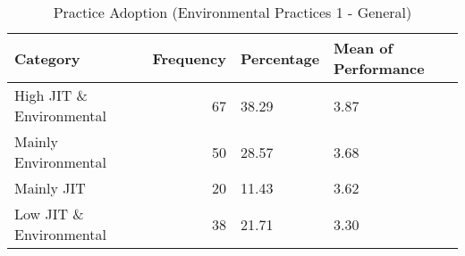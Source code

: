 \begin{table}[htbp]
    \centering
    \caption{Practice Adoption (Environmental Practices 1 - General)}
    \label{tab:your_label}
    \begin{tabular}{lrll}
\toprule
Category & Frequency & Percentage & Mean of Performance \\
\midrule
High JIT \& Environmental & 67 & 38.29 & 3.87 \\
Mainly Environmental & 50 & 28.57 & 3.68 \\
Mainly JIT & 20 & 11.43 & 3.62 \\
Low JIT \& Environmental & 38 & 21.71 & 3.30 \\
\bottomrule
\end{tabular}

    \end{table}
    